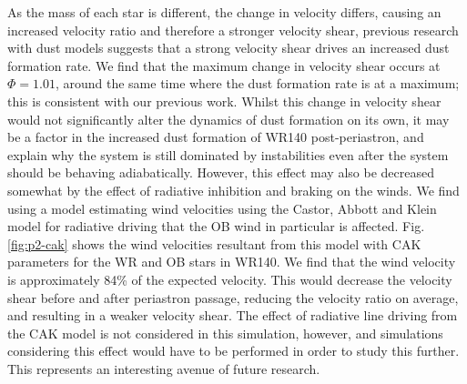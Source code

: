 \documentclass[fleqn,usenatbib]{mnras}
\begin{document}
\noindent
As the mass of each star is different, the change in velocity differs, causing an increased velocity ratio and therefore a stronger velocity shear, previous research with dust models suggests that a strong velocity shear drives an increased dust formation rate.
We find that the maximum change in velocity shear occurs at $\Phi = 1.01$, around the same time where the dust formation rate is at a maximum; this is consistent with our previous work.
Whilst this change in velocity shear would not significantly alter the dynamics of dust formation on its own, it may be a factor in the increased dust formation of WR140 post-periastron, and explain why the system is still dominated by instabilities even after the system should be behaving adiabatically.
However, this effect may also be decreased somewhat by the effect of radiative inhibition and braking on the winds.
We find using a model estimating wind velocities using the Castor, Abbott and Klein model \citep{castor_radiation-driven_1975} for radiative driving that the OB wind in particular is affected.
Fig. \ref{fig:p2-cak} shows the wind velocities resultant from this model with CAK parameters for the WR and OB stars in WR140.
We find that the wind velocity is approximately 84\% of the expected velocity.
This would decrease the velocity shear before and after periastron passage, reducing the velocity ratio on average, and resulting in a weaker velocity shear.
The effect of radiative line driving from the CAK model is not considered in this simulation, however, and simulations considering this effect would have to be performed in order to study this further.
This represents an interesting avenue of future research.



\end{document}
